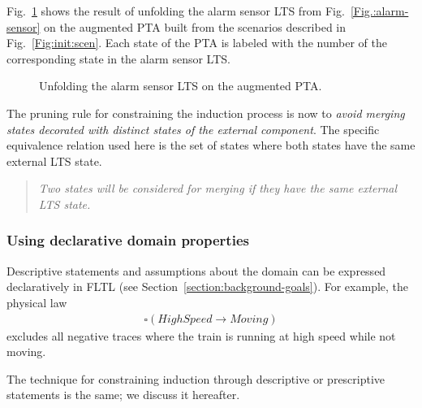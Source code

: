 Fig.~\ref{Fig.:alarm-unfolded-pta} shows the result of unfolding the alarm sensor LTS from Fig.~\ref{Fig.:alarm-sensor} on the augmented PTA built from the scenarios described in Fig.~\ref{Fig:init:scen}. Each state of the PTA is labeled with the number of the corresponding state in the alarm sensor LTS. 

\begin{figure}
\centering
{}
\caption{Unfolding the alarm sensor LTS on the augmented PTA\label{Fig.:alarm-unfolded-pta}.}
\end{figure}

The pruning rule for constraining the induction process is now to \emph{avoid merging states decorated with distinct states of the external component}. The specific equivalence relation used here is the set of states where both states have the same external LTS state. 

\begin{quote}
\emph{Two states will be considered for merging if they have the same external LTS state.}
\end{quote}


\subsubsection*{Using declarative domain properties}

Descriptive statements and assumptions about the domain can be expressed declaratively in FLTL (see Section~\ref{section:background-goals}). For example, the physical law
\begin{align*}
\square(HighSpeed \rightarrow Moving)
\end{align*}
\noindent excludes all negative traces where the train is running at high speed while not moving. 

The technique for constraining induction through descriptive or prescriptive statements is the same; we discuss it hereafter.

